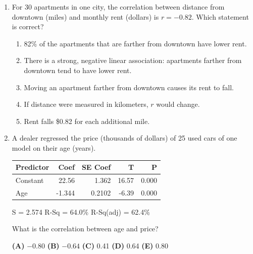 \documentclass[12pt]{article}
\begin{document}
\begin{enumerate}[leftmargin=1.9em, itemsep=0.13in]
  \boxguard[11]
  \item For 30 apartments in one city, the correlation between distance from downtown (miles)
        and monthly rent (dollars) is $r = -0.82$. Which statement is correct?
        \begin{enumerate}[label=\textbf{(\Alph*)}, leftmargin=2.2em, itemsep=2pt]
          \item 82\% of the apartments that are farther from downtown have lower rent.
          \item There is a strong, negative linear association: apartments farther from
                downtown tend to have lower rent.
          \item Moving an apartment farther from downtown causes its rent to fall.
          \item If distance were measured in kilometers, $r$ would change.
          \item Rent falls \$0.82 for each additional mile.\hfill{}\rule[-0.2in]{0pt}{0.48in}
        \end{enumerate}

  \boxguard[11]
  \item A dealer regressed the price (thousands of dollars) of 25 used cars of one model on
        their age (years).

        \vspace{2pt}
        {\centering\footnotesize\ttfamily
        \begin{tabular}{@{} l r r r r @{}}
        Predictor & Coef & SE Coef & T & P \\ \hline
        Constant & 22.56 & 1.362 & 16.57 & 0.000 \\
        Age & -1.344 & 0.2102 & -6.39 & 0.000 \\
        \end{tabular}\par
        S = 2.574 \quad R-Sq = 64.0\% \quad R-Sq(adj) = 62.4\%\par}
        \vspace{2pt}

        What is the correlation between age and price?\hfill{}\rule[-0.2in]{0pt}{0.48in}
        \par\vspace{3pt}\noindent
        \hspace{1.2em}\textbf{(A)} $-0.80$ \hfill \textbf{(B)} $-0.64$ \hfill
        \textbf{(C)} 0.41 \hfill \textbf{(D)} 0.64 \hfill \textbf{(E)} 0.80


\end{enumerate}
\end{document}
